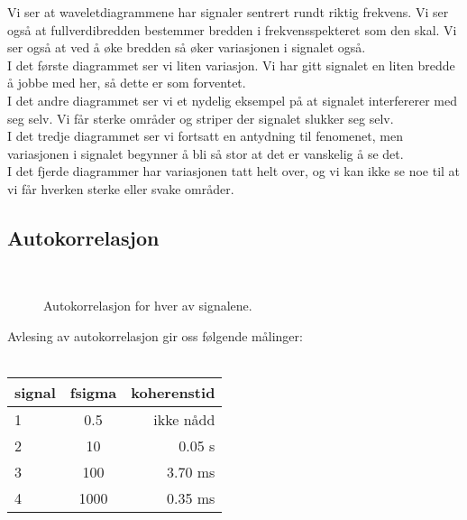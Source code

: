 \documentclass[12pt,norsk,a4paper]{article}
\begin{document}
Vi ser at waveletdiagrammene har signaler sentrert rundt riktig frekvens. Vi ser også at fullverdibredden bestemmer bredden i frekvensspekteret som den skal. Vi ser også at ved å øke bredden så øker variasjonen i signalet også.\\
I det første diagrammet ser vi liten variasjon. Vi har gitt signalet en liten bredde å jobbe med her, så dette er som forventet.\\
I det andre diagrammet ser vi et nydelig eksempel på at signalet interfererer med seg selv. Vi får sterke områder og striper der signalet slukker seg selv.\\
I det tredje diagrammet ser vi fortsatt en antydning til fenomenet, men variasjonen i signalet begynner å bli så stor at det er vanskelig å se det.\\
I det fjerde diagrammer har variasjonen tatt helt over, og vi kan ikke se noe til at vi får hverken sterke eller svake områder.

\subsection{Autokorrelasjon}

\begin{figure}[H]
\begin{center}
\\ 
\noindent 
{}
\end{center}
\caption[caption]{Autokorrelasjon for hver av signalene.} 
\end{figure}

Avlesing av autokorrelasjon gir oss følgende målinger:\\
\\
\begin{tabular}{| l | c | r |}
 \hline
  signal & fsigma 	& koherenstid\\
 \hline
  1 		& 0.5    	& ikke nådd\\
  2 		& 10   		& 0.05   s\\
  3 		& 100  		& 3.70 ms\\
  4 		& 1000  	& 0.35 ms\\
 \hline
\end{tabular}\\
\end{document}
